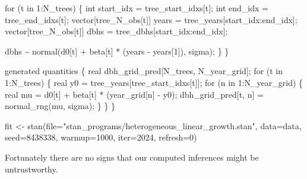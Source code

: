 \documentclass[
  letterpaper,
  DIV=11,
  numbers=noendperiod]{scrartcl}
\newenvironment{Shaded}{\begin{snugshade}}{\end{snugshade}}
\newcommand{\AttributeTok}[1]{\textcolor[rgb]{0.40,0.45,0.13}{#1}}
\newcommand{\ControlFlowTok}[1]{\textcolor[rgb]{0.00,0.23,0.31}{#1}}
\newcommand{\DataTypeTok}[1]{\textcolor[rgb]{0.68,0.00,0.00}{#1}}
\newcommand{\DecValTok}[1]{\textcolor[rgb]{0.68,0.00,0.00}{#1}}
\newcommand{\FunctionTok}[1]{\textcolor[rgb]{0.28,0.35,0.67}{#1}}
\newcommand{\KeywordTok}[1]{\textcolor[rgb]{0.00,0.23,0.31}{#1}}
\newcommand{\NormalTok}[1]{\textcolor[rgb]{0.00,0.23,0.31}{#1}}
\newcommand{\OtherTok}[1]{\textcolor[rgb]{0.00,0.23,0.31}{#1}}
\newcommand{\SpecialCharTok}[1]{\textcolor[rgb]{0.37,0.37,0.37}{#1}}
\newcommand{\StringTok}[1]{\textcolor[rgb]{0.13,0.47,0.30}{#1}}
\begin{document}
\begin{codelisting}
\begin{Shaded}
\begin{Highlighting}[]
  \ControlFlowTok{for}\NormalTok{ (t }\ControlFlowTok{in} \DecValTok{1}\NormalTok{:N\_trees) \{}
    \DataTypeTok{int}\NormalTok{ start\_idx = tree\_start\_idxs[t];}
    \DataTypeTok{int}\NormalTok{ end\_idx = tree\_end\_idxs[t];}
    \DataTypeTok{vector}\NormalTok{[tree\_N\_obs[t]] years = tree\_years[start\_idx:end\_idx];}
    \DataTypeTok{vector}\NormalTok{[tree\_N\_obs[t]] dbhs = tree\_dbhs[start\_idx:end\_idx];}
    
\NormalTok{    dbhs \textasciitilde{} normal(d0[t] + beta[t] * (years {-} years[}\DecValTok{1}\NormalTok{]), sigma);}
\NormalTok{  \}}
\NormalTok{\}}

\KeywordTok{generated quantities}\NormalTok{ \{}
  \DataTypeTok{real}\NormalTok{ dbh\_grid\_pred[N\_trees, N\_year\_grid];}
  \ControlFlowTok{for}\NormalTok{ (t }\ControlFlowTok{in} \DecValTok{1}\NormalTok{:N\_trees) \{}
    \DataTypeTok{real}\NormalTok{ y0 = tree\_years[tree\_start\_idxs[t]];}
    \ControlFlowTok{for}\NormalTok{ (n }\ControlFlowTok{in} \DecValTok{1}\NormalTok{:N\_year\_grid) \{}
      \DataTypeTok{real}\NormalTok{ mu = d0[t] + beta[t] * (year\_grid[n] {-} y0);}
\NormalTok{      dbh\_grid\_pred[t, n] = normal\_rng(mu, sigma);}
\NormalTok{    \}}
\NormalTok{  \}}
\NormalTok{\}}
\end{Highlighting}
\end{Shaded}

\end{codelisting}

\begin{Shaded}
\begin{Highlighting}[]
\NormalTok{fit }\OtherTok{\textless{}{-}} \FunctionTok{stan}\NormalTok{(}\AttributeTok{file=}\StringTok{"stan\_programs/heterogeneous\_linear\_growth.stan"}\NormalTok{,}
            \AttributeTok{data=}\NormalTok{data, }\AttributeTok{seed=}\DecValTok{8438338}\NormalTok{,}
            \AttributeTok{warmup=}\DecValTok{1000}\NormalTok{, }\AttributeTok{iter=}\DecValTok{2024}\NormalTok{, }\AttributeTok{refresh=}\DecValTok{0}\NormalTok{)}
\end{Highlighting}
\end{Shaded}

Fortunately there are no signs that our computed inferences might be
untrustworthy.

\begin{Shaded}
\end{Shaded}
\end{document}
